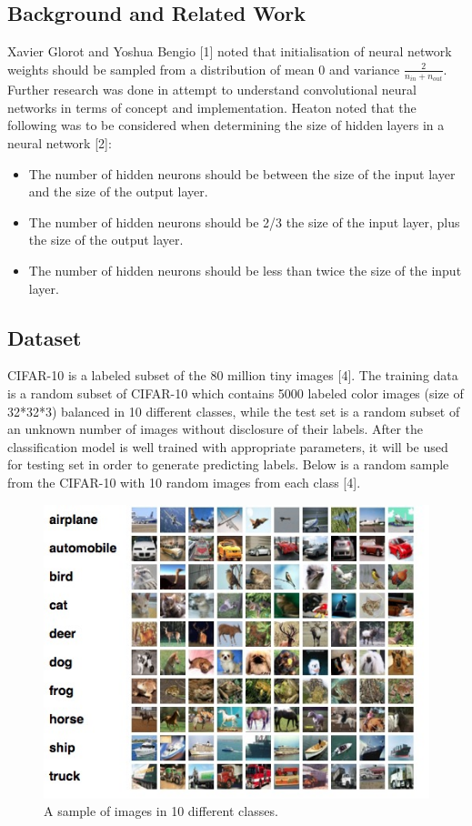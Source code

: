\documentclass{article} %
\begin{document}
\subsection{Background and Related Work}

Xavier Glorot and Yoshua Bengio [1] noted that initialisation of neural network weights should be sampled from a distribution of mean 0 and variance $\frac{2}{n_{in}+n_{out}}$.
Further research was done in attempt to understand convolutional neural networks in terms of concept and implementation. Heaton noted that the following was to be considered when determining the size of hidden layers in a neural network [2]:
\begin{itemize}
  \item The number of hidden neurons should be between the size of the input layer and the size of the output layer.
  \item The number of hidden neurons should be 2/3 the size of the input layer, plus the size of the output layer.
  \item The number of hidden neurons should be less than twice the size of the input layer.
\end{itemize}

\subsection{Dataset}
CIFAR-10 is a labeled subset of the 80 million tiny images [4]. The training data is a random subset of CIFAR-10 which contains 5000 labeled color images (size of 32*32*3) balanced in 10 different classes, while the test set is a random subset of an unknown number of images without disclosure of their labels. After the classification model is well trained with appropriate parameters, it will be used for testing set in order to generate predicting labels. Below is a random sample from the CIFAR-10 with 10 random images from each class [4].

\begin{figure}
\centering
\includegraphics[scale=0.55]{data.jpg}
\caption{A sample of images in 10 different classes. }
\end{figure}
\end{document}
